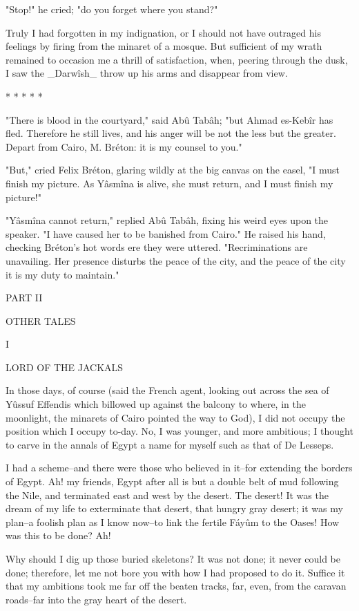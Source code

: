 "Stop!" he cried; "do you forget where you stand?"

Truly I had forgotten in my indignation, or I should not have outraged
his feelings by firing from the minaret of a mosque. But sufficient of
my wrath remained to occasion me a thrill of satisfaction, when,
peering through the dusk, I saw the _Darwîsh_ throw up his arms and
disappear from view.

       *       *       *       *       *

"There is blood in the courtyard," said Abû Tabâh; "but Ahmad es-Kebîr
has fled. Therefore he still lives, and his anger will be not the less
but the greater. Depart from Cairo, M. Bréton: it is my counsel to
you."

"But," cried Felix Bréton, glaring wildly at the big canvas on the
easel, "I must finish my picture. As Yâsmîna is alive, she must
return, and I must finish my picture!"

"Yâsmîna cannot return," replied Abû Tabâh, fixing his weird eyes upon
the speaker. "I have caused her to be banished from Cairo." He raised
his hand, checking Bréton's hot words ere they were uttered.
"Recriminations are unavailing. Her presence disturbs the peace of the
city, and the peace of the city it is my duty to maintain."




PART II

OTHER TALES




I

LORD OF THE JACKALS


In those days, of course (said the French agent, looking out across
the sea of Yûssuf Effendis which billowed up against the balcony to
where, in the moonlight, the minarets of Cairo pointed the way to
God), I did not occupy the position which I occupy to-day. No, I was
younger, and more ambitious; I thought to carve in the annals of Egypt
a name for myself such as that of De Lesseps.

I had a scheme--and there were those who believed in it--for extending
the borders of Egypt. Ah! my friends, Egypt after all is but a double
belt of mud following the Nile, and terminated east and west by the
desert. The desert! It was the dream of my life to exterminate that
desert, that hungry gray desert; it was my plan--a foolish plan as I
know now--to link the fertile Fáyûm to the Oases! How was this to be
done? Ah!

Why should I dig up those buried skeletons? It was not done; it never
could be done; therefore, let me not bore you with how I had proposed
to do it. Suffice it that my ambitions took me far off the beaten
tracks, far, even, from the caravan roads--far into the gray heart of
the desert.

